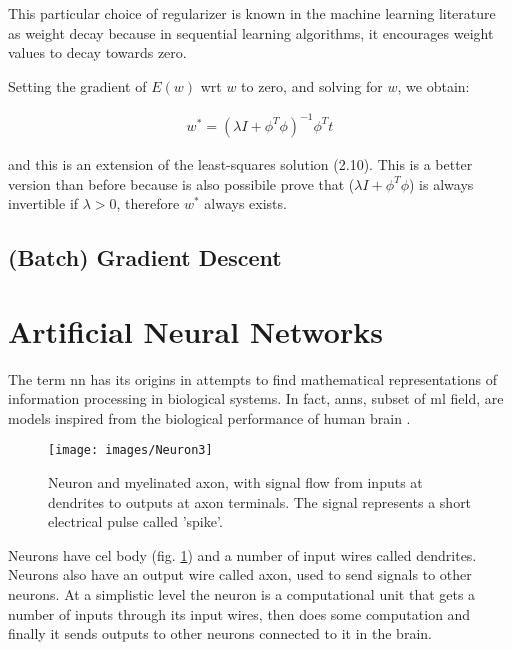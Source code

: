 \noindent This particular choice of regularizer is known in the machine learning literature as
weight decay because in sequential learning algorithms, it encourages weight values
to decay towards zero.

\noindent Setting the gradient of $E(w)$ wrt $w$ to zero, and solving for $w$, we obtain:

\begin{Equation}[H]
	\centering
		\begin{equation}
			\begin{aligned}
				w^* = (\lambda I + \phi^T \phi)^{-1} \phi^T t
			\end{aligned}
		\end{equation}
	\label{eq:mathmodelaada}
\end{Equation}

\noindent and this is an extension of the least-squares solution (2.10). This is a better version than before because is also possibile prove that ($\lambda I + \phi^T \phi$) is always invertible if $\lambda > 0$, therefore $w^*$ always exists.

\subsection{(Batch) Gradient Descent}
\label{subsec:batchgradientdescen}




\section{Artificial Neural Networks}
\label{sec:nn}
The term  \gls{nn} has its origins in attempts to find mathematical representations of information processing in biological systems. In fact, \glspl{ann}, subset of \gls{ml} field, are models inspired from the biological performance of human brain \cite[]{inbook}. 

\begin{figure}[H]
	\centering
	\texttt{[image: images/Neuron3]}
	\caption[Image of a human neuron.]{Neuron and myelinated axon, with signal flow from inputs at dendrites to outputs at axon terminals. The signal represents a short electrical pulse called 'spike'.}
	\label{fig:bioneuron}
\end{figure}

\noindent Neurons have cel body (fig. \ref{fig:bioneuron}) and a number of input wires called dendrites. Neurons also have an output wire called axon, used to send signals to other neurons. At a simplistic level the neuron is a computational unit that gets a number of inputs through its input wires, then does some computation and finally it sends outputs to other neurons connected to it in the brain. \\

